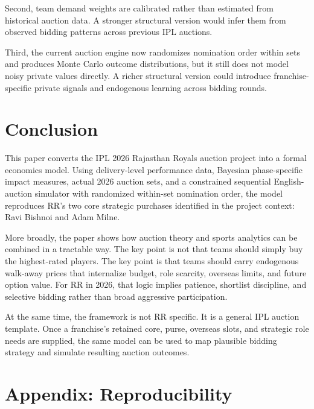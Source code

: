 \documentclass[11pt]{article}
\begin{document}
Second, team demand weights are calibrated rather than estimated from historical auction data. A stronger structural version would infer them from observed bidding patterns across previous IPL auctions.

Third, the current auction engine now randomizes nomination order within sets and produces Monte Carlo outcome distributions, but it still does not model noisy private values directly. A richer structural version could introduce franchise-specific private signals and endogenous learning across bidding rounds.

\section{Conclusion}

This paper converts the IPL 2026 Rajasthan Royals auction project into a formal economics model. Using delivery-level performance data, Bayesian phase-specific impact measures, actual 2026 auction sets, and a constrained sequential English-auction simulator with randomized within-set nomination order, the model reproduces RR's two core strategic purchases identified in the project context: Ravi Bishnoi and Adam Milne.

More broadly, the paper shows how auction theory and sports analytics can be combined in a tractable way. The key point is not that teams should simply buy the highest-rated players. The key point is that teams should carry endogenous walk-away prices that internalize budget, role scarcity, overseas limits, and future option value. For RR in 2026, that logic implies patience, shortlist discipline, and selective bidding rather than broad aggressive participation.

At the same time, the framework is not RR specific. It is a general IPL auction template. Once a franchise's retained core, purse, overseas slots, and strategic role needs are supplied, the same model can be used to map plausible bidding strategy and simulate resulting auction outcomes.

\appendix

\section*{Appendix: Reproducibility}
\end{document}
